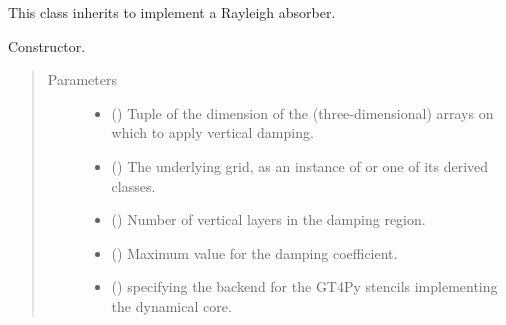 \documentclass[letterpaper,10pt,english]{sphinxmanual}
\begin{document}
\begin{fulllineitems}
\label{\detokenize{api:tasmania.dycore.vertical_damping.VerticalDampingRayleigh}}
This class inherits {\hyperref[\detokenize{api:tasmania.dycore.vertical_damping.VerticalDamping}]{}} to implement a Rayleigh absorber.

\begin{fulllineitems}
\label{\detokenize{api:tasmania.dycore.vertical_damping.VerticalDampingRayleigh.__init__}}
Constructor.
\begin{quote}\begin{description}
\item[{Parameters}] \leavevmode\begin{itemize}
\item {} 
 () \textendash{} Tuple of the dimension of the (three-dimensional) arrays on which to apply vertical damping.

\item {} 
 () \textendash{} The underlying grid, as an instance of {\hyperref[\detokenize{api:tasmania.grids.grid_xyz.GridXYZ}]{}} or one of its derived classes.

\item {} 
 () \textendash{} Number of vertical layers in the damping region.

\item {} 
 () \textendash{} Maximum value for the damping coefficient.

\item {} 
 () \textendash{}  specifying the backend for the GT4Py stencils implementing the dynamical core.

\end{itemize}


\end{description}
\end{quote}
\end{fulllineitems}
\end{fulllineitems}
\end{document}
